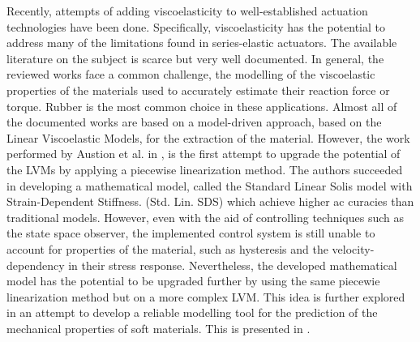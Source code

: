 Recently, attempts of adding viscoelasticity to well-established actuation technologies have been done. Specifically, viscoelasticity has the potential to address many of the limitations found in series-elastic actuators. The available literature on the subject is scarce but very well documented. In general, the reviewed works face a common challenge, the modelling of the viscoelastic properties of the materials used to accurately estimate their reaction force or torque. Rubber is the most common choice in these applications. Almost all of the documented works are based on a model-driven approach, based on the Linear Viscoelastic Models, for the extraction of the material. However, the work performed by Austion et al. in \cite{austin2015control}, is the first attempt to upgrade the potential of the LVMs by applying a piecewise linearization method. The authors succeeded in developing a mathematical model, called the Standard Linear Solis model with Strain-Dependent Stiffness. (Std. Lin. SDS) which achieve higher ac curacies than traditional models. However, even with the aid of controlling techniques such as the state space observer, the implemented control system is still unable to account for properties of the material, such as hysteresis and the velocity-dependency in their stress response. Nevertheless, the developed mathematical model has the potential to be upgraded further by using the same piecewie linearization method but on a more complex LVM. This idea is further explored in an attempt to develop a reliable modelling tool for the prediction of the mechanical properties of soft materials. This is presented in .


